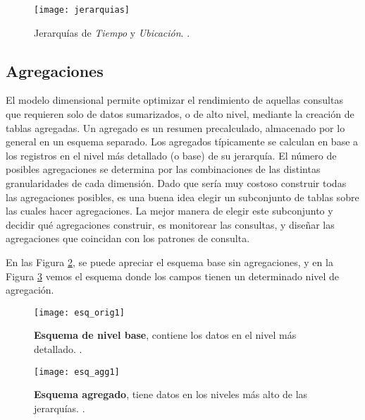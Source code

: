 \documentclass[a4paper,11pt]{article}
\begin{document}
    \begin{figure}
      \begin{center}
        \texttt{[image: jerarquias]}
        \caption{Jerarquías de \textit{Tiempo} y \textit{Ubicación}. \cite[p.~94]{olap_solutions}.}
        \label{jerarquias}
      \end{center}
    \end{figure}
    
    
    \subsection{Agregaciones} \label{agregaciones}
    
    El modelo dimensional permite optimizar el rendimiento de aquellas consultas que requieren solo de datos sumarizados, o de alto nivel,
    mediante la creación de tablas agregadas.
    Un agregado es un resumen precalculado, almacenado por lo general en un esquema separado. Los agregados típicamente se calculan en base
    a los registros en el nivel más detallado (o base) de su jerarquía.
    El número de posibles agregaciones se determina por las combinaciones de las distintas granularidades de cada dimensión.
    Dado que sería muy costoso construir todas las agregaciones  posibles, es una buena idea elegir un subconjunto de tablas sobre las cuales
    hacer agregaciones. La mejor manera de elegir este subconjunto y decidir qué  agregaciones construir, es monitorear las consultas, y diseñar
    las agregaciones que coincidan con los patrones de consulta.
    
    En las Figura \ref{sch_orig1}, se puede apreciar el esquema base sin agregaciones, y en la Figura \ref{sch_agg1} vemos el esquema
    donde los campos tienen un determinado nivel de agregación.
    
    \begin{figure}
      \begin{center}
        \texttt{[image: esq\_orig1]}
        \caption{\textbf{Esquema de nivel base}, contiene los datos en el nivel más detallado. \cite[p.~172]{nagabhushana}.}
        \label{sch_orig1}
      \end{center}
    \end{figure}
    
    \begin{figure}
      \begin{center}
        \texttt{[image: esq\_agg1]}
        \caption{\textbf{Esquema agregado}, tiene datos en los niveles más alto de las jerarquías. \cite[p.~172]{nagabhushana}.}
        \label{sch_agg1}
      \end{center}
    \end{figure}
    
\end{document}
